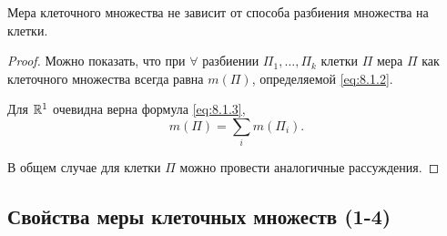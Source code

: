 \begin{lemma}
    Мера клеточного множества не зависит от способа разбиения множества на клетки.
\end{lemma}

\begin{proof}
    Можно показать, что при $\forall$ разбиении $\Pi_1,\ldots,\Pi_k$ клетки $\Pi$ мера $\Pi$ как клеточного множества всегда равна $m(\Pi)$, определяемой \ref{eq:8.1.2}.

    Для $\mathbb{R}^1$ очевидна верна формула \ref{eq:8.1.3},
    \[
        m(\Pi) = \underset{i}{\sum}m(\Pi_i).
    \]

    В общем случае для клетки $\Pi$ можно провести аналогичные рассуждения.
\end{proof}

\subsection{Свойства меры клеточных множеств (1-4)}\label{subsec:8.1.3}

